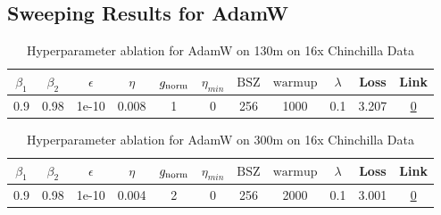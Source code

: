 \subsection{Sweeping Results for AdamW}%
\begin{table}[H]
\centering
\caption{Hyperparameter ablation for AdamW on 130m on 16x Chinchilla Data}
\label{tab:ablation_adamw_130m_on_16x_chinchilla_data}
\begin{tabular}{ccccccccccc}
\toprule
$\beta_1$ & $\beta_2$ & $\epsilon$ & $\eta$ & $g_{\mathrm{norm}}$ & $\eta_{min}$ & $\mathrm{BSZ}$ & $\mathrm{warmup}$ & $\lambda$ & Loss & Link \\
\midrule
0.9 & 0.98 & 1e-10 & 0.008 & 1 & 0 & 256 & 1000 & 0.1 & 3.207 & \href{https://wandb.ai/marin-community/optimizer-scaling/runs/sweep-130m-42B-adamwdf6bfb1lr0.008-wd0.1-minlr0-warmup1000-b10.9-c5d61d}{0} \\
\midrule
\bottomrule
\end{tabular}
\end{table}

\begin{table}[H]
\centering
\caption{Hyperparameter ablation for AdamW on 300m on 16x Chinchilla Data}
\label{tab:ablation_adamw_300m_on_16x_chinchilla_data}
\begin{tabular}{ccccccccccc}
\toprule
$\beta_1$ & $\beta_2$ & $\epsilon$ & $\eta$ & $g_{\mathrm{norm}}$ & $\eta_{min}$ & $\mathrm{BSZ}$ & $\mathrm{warmup}$ & $\lambda$ & Loss & Link \\
\midrule
0.9 & 0.98 & 1e-10 & 0.004 & 2 & 0 & 256 & 2000 & 0.1 & 3.001 & \href{https://wandb.ai/marin-community/optimizer-scaling/runs/sweep-300m-96B-adamwfcee97lr0.004-wd0.1-minlr0-warmup2000-b10.9--18b705}{0} \\
\midrule
\bottomrule
\end{tabular}
\end{table}

